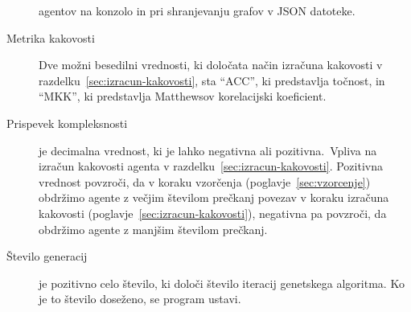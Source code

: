\documentclass[a4paper,12pt,openright]{book}
\begin{document}
\begin{description}
{        agentov na konzolo in pri shranjevanju grafov v JSON datoteke. }
        \item[Metrika kakovosti]{Dve možni besedilni vrednosti, ki določata način izra\-ču\-na kakovosti v razdelku~\ref{sec:izracun-kakovosti},
        sta \enquote{ACC}, ki predstavlja točnost, in \enquote{MKK}, ki predstavlja Matthewsov korelacijski koeficient.}
        \item[Prispevek kompleksnosti]{je decimalna vrednost, ki je lahko negativna ali pozitivna.\ Vpliva na izračun kakovosti agenta v razdelku~\ref{sec:izracun-kakovosti}.
        Pozitivna vrednost povzroči, da v koraku vzorčenja (poglavje~\ref{sec:vzorcenje}) obdržimo agente z večjim številom
        prečkanj povezav v koraku izračuna kakovosti (poglavje~\ref{sec:izracun-kakovosti}), negativna pa povzroči, da
        obdržimo agente z manjšim številom prečkanj.}
        \item[Število generacij]{je pozitivno celo število, ki določi število iteracij genetskega algoritma. Ko je to število doseženo, se program ustavi.}
    \end{description}
\end{document}
